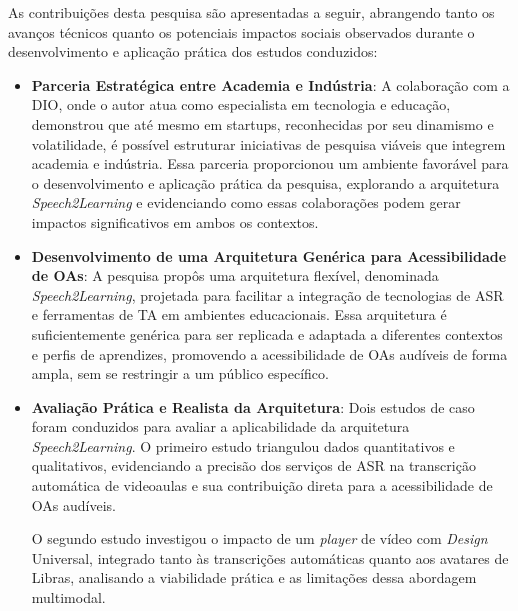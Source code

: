 
As contribuições desta pesquisa são apresentadas a seguir, abrangendo tanto os avanços técnicos quanto os potenciais impactos sociais observados durante o desenvolvimento e aplicação prática dos estudos conduzidos:

\begin{itemize} 

    \item \textbf{Parceria Estratégica entre Academia e Indústria}: A colaboração com a DIO, onde o autor atua como especialista em tecnologia e educação, demonstrou que até mesmo em startups, reconhecidas por seu dinamismo e volatilidade, é possível estruturar iniciativas de pesquisa viáveis que integrem academia e indústria. Essa parceria proporcionou um ambiente favorável para o desenvolvimento e aplicação prática da pesquisa, explorando a arquitetura \textit{Speech2Learning} e evidenciando como essas colaborações podem gerar impactos significativos em ambos os contextos.

    \item \textbf{Desenvolvimento de uma Arquitetura Genérica para Acessibilidade de OAs}: A pesquisa propôs uma arquitetura flexível, denominada \textit{Speech2Learning}, projetada para facilitar a integração de tecnologias de ASR e ferramentas de TA em ambientes educacionais. Essa arquitetura é suficientemente genérica para ser replicada e adaptada a diferentes contextos e perfis de aprendizes, promovendo a acessibilidade de OAs audíveis de forma ampla, sem se restringir a um público específico.

    \item \textbf{Avaliação Prática e Realista da Arquitetura}: Dois estudos de caso foram conduzidos para avaliar a aplicabilidade da arquitetura \textit{Speech2Learning}. O primeiro estudo triangulou dados quantitativos e qualitativos, evidenciando a precisão dos serviços de ASR na transcrição automática de videoaulas e sua contribuição direta para a acessibilidade de OAs audíveis. 
    
    O segundo estudo investigou o impacto de um \textit{player} de vídeo com \textit{Design} Universal, integrado tanto às transcrições automáticas quanto aos avatares de Libras, analisando a viabilidade prática e as limitações dessa abordagem multimodal.


\end{itemize}
